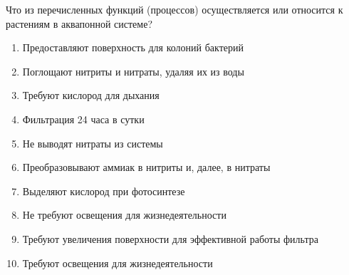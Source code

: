 
Что из перечисленных функций (процессов) осуществляется или относится к растениям в аквапонной системе?  

\begin{enumerate}
    \item Предоставляют поверхность для колоний бактерий
    \item Поглощают нитриты и нитраты, удаляя их из воды
    \item Требуют кислород для дыхания
    \item Фильтрация 24 часа в сутки
    \item Не выводят нитраты из системы
    \item Преобразовывают аммиак в нитриты и, далее, в нитраты
    \item Выделяют кислород при фотосинтезе
    \item Не требуют освещения для жизнедеятельности
    \item Требуют увеличения поверхности для эффективной работы фильтра
    \item Требуют освещения для жизнедеятельности
\end{enumerate}